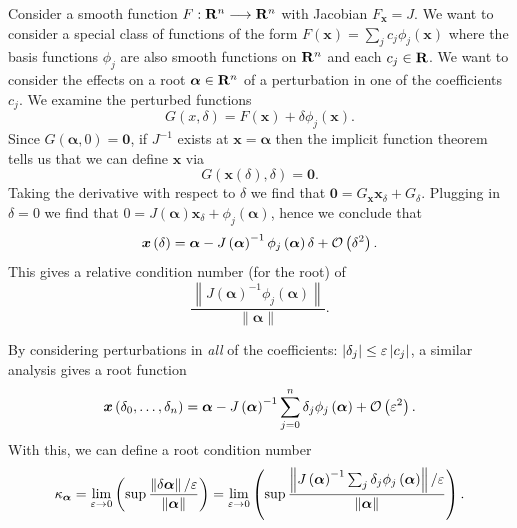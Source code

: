 Consider a smooth function \(F: \mathbf{R}^n \longrightarrow \mathbf{R}^n\)
with Jacobian \(F_{\bm{x}} = J\). We want to consider a special class of
functions of the form \(F\left(\bm{x}\right) = \sum_j c_j
\phi_j\left(\bm{x}\right)\) where the basis
functions \(\phi_j\) are also smooth functions on \(\mathbf{R}^n\)
and each \(c_j \in \mathbf{R}\). We want to consider the effects on a root
\(\bm{\alpha} \in \mathbf{R}^n\) of a perturbation in one of the
coefficients \(c_j\). We examine the perturbed functions
\begin{equation}
G(x, \delta) = F\left(\bm{x}\right) + \delta \phi_j\left(\bm{x}\right).
\end{equation}
Since \(G\left(\bm{\alpha}, 0\right) = \bm{0}\), if \(J^{-1}\) exists at
\(\bm{x} = \bm{\alpha}\) then
the implicit function theorem tells us that we can define
\(\bm{x}\) via
\begin{equation}
G\left(\bm{x}\left(\delta\right), \delta\right) = \bm{0}.
\end{equation}
Taking the derivative with respect to \(\delta\) we find that
\(\bm{0} = G_{\bm{x}} \bm{x}_{\delta} + G_{\delta}\). Plugging in
\(\delta = 0\) we find that \(0 = J\left(\bm{\alpha}\right) \bm{x}_{\delta} +
\phi_j\left(\bm{\alpha}\right)\), hence we
conclude that
\begin{equation}
\bm{x}\left(\delta\right) = \bm{\alpha} - J\left(\bm{\alpha}\right)^{-1}
  \phi_j\left(\bm{\alpha}\right) \delta + \mathcal{O}\left(\delta^2\right).
\end{equation}
This gives a relative condition number (for the root) of
\begin{equation}
\frac{\left \lVert J\left(\bm{\alpha}\right)^{-1}
  \phi_j\left(\bm{\alpha}\right) \right \rVert}{
  \left \lVert \bm{\alpha} \right \rVert}.
\end{equation}

By considering perturbations in \emph{all} of the coefficients:
\(\left|\delta_j\right| \leq \varepsilon \left|c_j\right|\), a similar analysis
gives a root function
\begin{equation}
\bm{x}\left(\delta_0, \ldots, \delta_n\right) = \bm{\alpha} -
  J\left(\bm{\alpha}\right)^{-1} \sum_{j = 0}^n \delta_j
  \phi_j\left(\bm{\alpha}\right) + \mathcal{O}\left(\varepsilon^2\right).
\end{equation}
With this, we can define a root condition number
\begin{equation}\label{eq:abstract-cond-num}
\kappa_{\bm{\alpha}} =
  \lim_{\varepsilon \to 0} \left(\sup \frac{\left \lVert\delta \bm{\alpha}
  \right \rVert / \varepsilon}{\left \lVert\bm{\alpha}\right \rVert}\right) =
  \lim_{\varepsilon \to 0} \left(\sup \frac{\left \lVert
  J\left(\bm{\alpha}\right)^{-1} \sum_j \delta_j
  \phi_j\left(\bm{\alpha}\right) \right \rVert / \varepsilon}{
  \left \lVert\bm{\alpha}\right \rVert}\right).
\end{equation}


